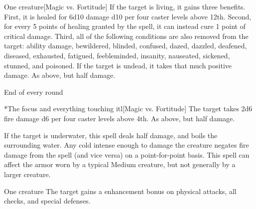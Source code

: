 \spellrng{\rngclose}
\begin{spelltarget}{One creature}[Magic vs. Fortitude]
    \spelleffect If the target is living, it gains three benefits. First, it is healed for 6d10 damage \add d10 per four caster levels above 12th. Second, for every 5 points of healing granted by the spell, it can instead cure 1 point of critical damage. Third, all of the following conditions are also removed from the target: ability damage, bewildered, blinded, confused, dazed, dazzled, deafened, diseased, exhausted, fatigued, feebleminded, insanity, nauseated, sickened, stunned, and poisoned.
    \spellsuccess If the target is undead, it takes that much positive damage.
    \spellfailure As above, but half damage.
\end{spelltarget}

\spellrng{\rngmed}
\spelldur{\durshort \dismissable}
\begin{spelltrigger}{End of every round}
    \begin{spelltargets}*{The focus and everything touching it}l[Magic vs. Fortitude]
        \spellsuccess The target takes 2d6 fire damage \add d6 per four caster levels above 4th.
        \spellfailure As above, but half damage.
    \end{spelltargets}
\end{spelltrigger}
\spellnotes If the target is underwater, this spell deals half damage, and boils the surrounding water. Any cold intense enough to damage the creature negates fire damage from the spell (and vice versa) on a point-for-point basis. This spell can affect the armor worn by a typical Medium creature, but not generally by a larger creature.

\spellrng{\rngclose}
\spelldur{\durshort \dismissable}
\begin{spelltarget}{One creature}
    \spelleffect The target gains a  enhancement bonus on physical attacks, all checks, and special defenses. \spellbonusscalingdescription
\end{spelltarget}

